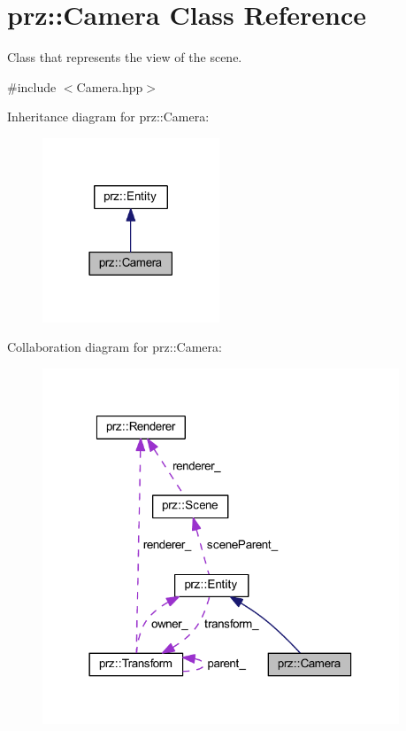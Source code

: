 \hypertarget{classprz_1_1_camera}{}\section{prz\+::Camera Class Reference}
\label{classprz_1_1_camera}


Class that represents the view of the scene.  




{\ttfamily \#include $<$Camera.\+hpp$>$}



Inheritance diagram for prz\+::Camera\+:
\nopagebreak
\begin{figure}[H]
\begin{center}
\leavevmode
\includegraphics[width=150pt]{classprz_1_1_camera__inherit__graph}
\end{center}
\end{figure}


Collaboration diagram for prz\+::Camera\+:
\nopagebreak
\begin{figure}[H]
\begin{center}
\leavevmode
\includegraphics[width=302pt]{classprz_1_1_camera__coll__graph}
\end{center}
\end{figure}
